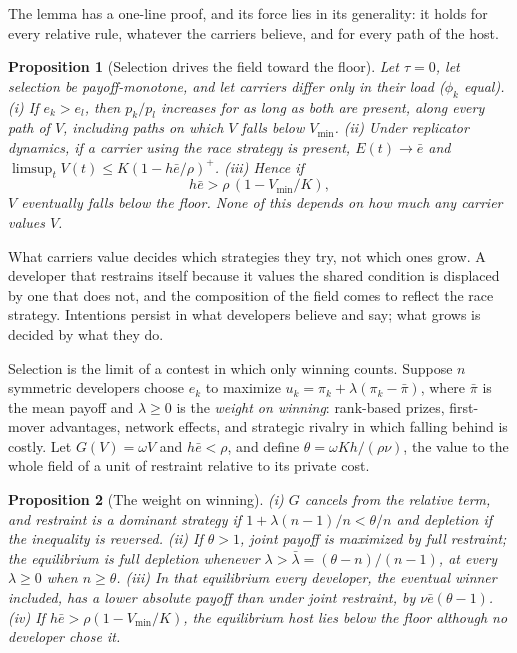 \documentclass[letterpaper]{article} %
\newtheorem{proposition}{Proposition}
\theoremstyle{definition}
\newcommand{\Vmin}{V_{\min}}
\begin{document}
The lemma has a one-line proof, and its force lies in its generality: it holds for every relative rule, whatever the carriers believe, and for every path of the host.

\begin{proposition}[Selection drives the field toward the floor]\label{prop:first}
Let $\tau=0$, let selection be payoff-monotone, and let carriers differ only in their load ($\phi_k$ equal). (i) If $e_k>e_l$, then $p_k/p_l$ increases for as long as both are present, along every path of $V$, including paths on which $V$ falls below $\Vmin$. (ii) Under replicator dynamics, if a carrier using the race strategy is present, $E(t)\to\bar e$ and $\limsup_tV(t)\le K(1-h\bar e/\rho)^+$. (iii) Hence if
\begin{equation}\label{eq:C0}
h\bar e>\rho\,(1-\Vmin/K),
\end{equation}
$V$ eventually falls below the floor. None of this depends on how much any carrier values $V$.
\end{proposition}

What carriers value decides which strategies they try, not which ones grow. A developer that restrains itself because it values the shared condition is displaced by one that does not, and the composition of the field comes to reflect the race strategy. Intentions persist in what developers believe and say; what grows is decided by what they do.

Selection is the limit of a contest in which only winning counts. Suppose $n$ symmetric developers choose $e_k$ to maximize $u_k=\pi_k+\lambda(\pi_k-\bar\pi)$, where $\bar\pi$ is the mean payoff and $\lambda\ge0$ is the \emph{weight on winning}: rank-based prizes, first-mover advantages, network effects, and strategic rivalry in which falling behind is costly. Let $G(V)=\omega V$ and $h\bar e<\rho$, and define $\theta=\omega Kh/(\rho\nu)$, the value to the whole field of a unit of restraint relative to its private cost.

\begin{proposition}[The weight on winning]\label{prop:game}
(i) $G$ cancels from the relative term, and restraint is a dominant strategy if $1+\lambda(n-1)/n<\theta/n$ and depletion if the inequality is reversed. (ii) If $\theta>1$, joint payoff is maximized by full restraint; the equilibrium is full depletion whenever $\lambda>\bar\lambda=(\theta-n)/(n-1)$, at every $\lambda\ge0$ when $n\ge\theta$. (iii) In that equilibrium every developer, the eventual winner included, has a lower absolute payoff than under joint restraint, by $\nu\bar e(\theta-1)$. (iv) If $h\bar e>\rho(1-\Vmin/K)$, the equilibrium host lies below the floor although no developer chose it.
\end{proposition}
\end{document}

